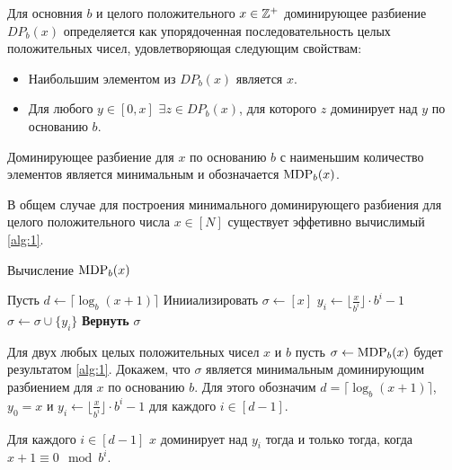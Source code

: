 \begin{definition}
	Для основния $b$ и целого положительного $x \in \mathbb{Z}^+$ доминирующее разбиение $DP_b(x)$ определяется как упорядоченная последовательность целых положительных чисел, удовлетворяющая следующим свойствам:
	\begin{itemize}
		\item Наибольшим элементом из $DP_b(x)$ является $x$.
		\item Для любого $y \in [0, x]$ $\exists z \in DP_b(x)$, для которого $z$ доминирует над $y$ по основанию $b$.
	\end{itemize}
\end{definition}

\begin{definition}
	Доминирующее разбиение для $x$ по основанию $b$ с наименьшим количество элементов является минимальным и обозначается $\text{MDP}_b(x)$.
\end{definition}


В общем случае для построения минимального доминирующего разбиения для целого положительного числа $x \in [N]$ существует эффетивно вычислимый \ref{alg:1}.

\begin{algorithm}
    \caption{Вычисление $\text{MDP}_b(x)$}
    \label{alg:1}
    \begin{algorithmic}
        \STATE Пусть $d \leftarrow \lceil \log_b(x+1) \rceil$
        \STATE Инииализировать $\sigma \leftarrow [x]$
                \STATE $y_i \leftarrow \lfloor \frac{x}{b^i} \rfloor \cdot b^i - 1$
                \STATE $\sigma \leftarrow \sigma \cup \{y_i\}$
            \ENDIF
        \ENDFOR
        \STATE \textbf{Вернуть} $\sigma$
    \end{algorithmic}
\end{algorithm}

Для двух любых целых положительных чисел $x$ и $b$ пусть $\sigma \leftarrow \text{MDP}_b(x)$ будет результатом \ref{alg:1}.
Докажем, что $\sigma$ является минимальным доминирующим разбиением для $x$ по основанию $b$.
Для этого обозначим $d = \lceil \log_b(x + 1) \rceil$, $y_0 = x$ и $y_i \leftarrow \lfloor \frac{x}{b^i} \rfloor \cdot b^i - 1$ для каждого $i \in [d - 1]$.

\begin{theorem}
	\label{lemma:1}
	Для каждого $i \in [d - 1]$ $x$ доминирует над $y_i$ тогда и только тогда, когда $x + 1 \equiv 0 \mod b^i$.
\end{theorem}

